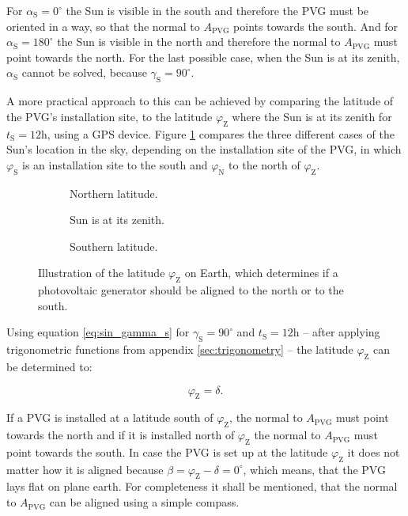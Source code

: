For $\alpha_{\mathrm{S}} = 0^\circ$ the Sun is visible in the south and therefore the PVG must be oriented in a way, so that the normal to $A_{\mathrm{PVG}}$ points towards the south. And for $\alpha_{\mathrm{S}} = 180^\circ$ the Sun is visible in the north and therefore the normal to $A_{\mathrm{PVG}}$ must point towards the north. For the last possible case, when the Sun is at its zenith, $\alpha_{\mathrm{S}}$ cannot be solved, because $\gamma_{\mathrm{S}} = 90^\circ$.

A more practical approach to this can be achieved by comparing the latitude of the PVG's installation site, to the latitude $\varphi_{\mathrm{Z}}$ where the Sun is at its zenith for $t_{\mathrm{S}} = 12\mathrm{h}$, using a GPS device. Figure \ref{fig:crucial_latitudes} compares the three different cases of the Sun's location in the sky, depending on the installation site of the PVG, in which $\varphi_{\mathrm{S}}$ is an installation site to the south and $\varphi_{\mathrm{N}}$ to the north of $\varphi_{\mathrm{Z}}$.

\begin{figure}[h!]
	\centering
		\begin{subfigure}[b]{0.3\linewidth}
			
			\caption{Northern latitude.}
		\end{subfigure}
		\begin{subfigure}[b]{0.3\linewidth}
			
			\caption{Sun is at its zenith.}
		\end{subfigure}
		\begin{subfigure}[b]{0.3\linewidth}
			
			\caption{Southern latitude.}
		\end{subfigure}
	\caption{Illustration of the latitude $\varphi_{\mathrm{Z}}$ on Earth, which determines if a photovoltaic generator should be aligned to the north or to the south.}
	\label{fig:crucial_latitudes}
\end{figure}

Using equation \ref{eq:sin_gamma_s} for $\gamma_{\mathrm{S}} = 90^\circ$ and $t_{\mathrm{S}} = 12\mathrm{h}$ -- after applying trigonometric functions from appendix \ref{sec:trigonometry} -- the latitude $\varphi_{\mathrm{Z}}$ can be determined to:
\begin{center}
	\begin{equation} \label{eq:phi_z}
		\varphi_{\mathrm{Z}} = \delta \text{.}
	\end{equation}
\end{center}
If a PVG is installed at a latitude south of $\varphi_{\mathrm{Z}}$, the normal to $A_{\mathrm{PVG}}$ must point towards the north and if it is installed north of $\varphi_{\mathrm{Z}}$ the normal to $A_{\mathrm{PVG}}$ must point towards the south. In case the PVG is set up at the latitude $\varphi_{\mathrm{Z}}$ it does not matter how it is aligned because $\beta = \varphi_{\mathrm{Z}} - \delta = 0^\circ$, which means, that the PVG lays flat on plane earth. For completeness it shall be mentioned, that the normal to $A_{\mathrm{PVG}}$ can be aligned using a simple compass.

